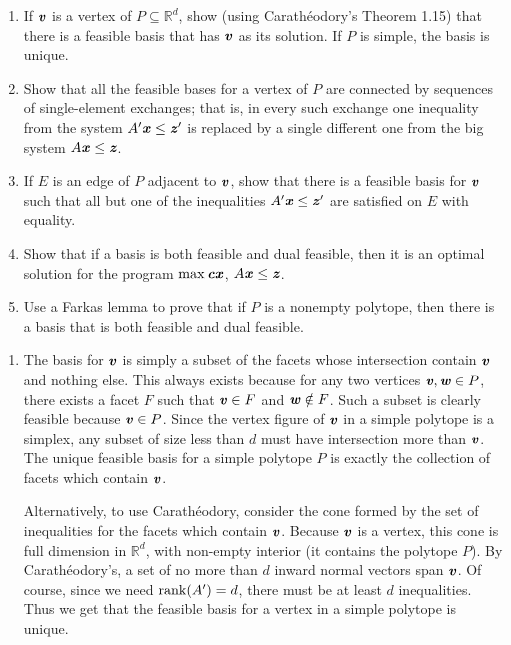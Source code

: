 \documentclass{article}
\begin{document}
\begin{enumerate}
\begin{enumerate}[label=(\roman*)]
\item If $\textbf{\textit{v}}$ is a vertex of $P \subseteq \mathbb{R}^d$, show (using Carath\'eodory's Theorem 1.15) that there is a feasible basis that has $\textbf{\textit{v}}$ as its solution. If $P$ is simple, the basis is unique.

\item Show that all the feasible bases for a vertex of $P$ are connected by sequences of single-element exchanges; that is, in every such exchange one inequality from the system $A'\textbf{\textit{x}} \le \textbf{\textit{z}}'$ is replaced by a single different one from the big system $A\textbf{\textit{x}} \le \textbf{\textit{z}}$.

\item If $E$ is an edge of $P$ adjacent to $\textbf{\textit{v}}$, show that there is a feasible basis for $\textbf{\textit{v}}$ such that all but one of the inequalities $A'\textbf{\textit{x}} \le \textbf{\textit{z}}'$ are satisfied on $E$ with equality.

\item Show that if a basis is both feasible and dual feasible, then it is an optimal solution for the program $\max \textbf{\textit{cx}}$, $A\textbf{\textit{x}} \le \textbf{\textit{z}}$.

\item Use a Farkas lemma to prove that if $P$ is a nonempty polytope, then there is a basis that is both feasible and dual feasible.
\end{enumerate}

\begin{solution}
\begin{enumerate}[label=(\roman*)]
    \item The basis for $\textbf{\textit{v}}$ is simply a subset of the facets whose intersection contain $\textbf{\textit{v}}$ and nothing else. This always exists because for any two vertices $\textbf{\textit{v}}, \textbf{\textit{w}} \in P$, there exists a facet $F$ such that $\textbf{\textit{v}} \in F$ and $\textbf{\textit{w}} \notin F$. Such a subset is clearly feasible because $\textbf{\textit{v}} \in P$. Since the vertex figure of $\textbf{\textit{v}}$ in a simple polytope is a simplex, any subset of size less than $d$ must have intersection more than $\textbf{\textit{v}}$. The unique feasible basis for a simple polytope $P$ is exactly the collection of facets which contain $\textbf{\textit{v}}$.

    Alternatively, to use Carath\'eodory, consider the cone formed by the set of inequalities for the facets which contain $\textbf{\textit{v}}$. Because $\textbf{\textit{v}}$ is a vertex, this cone is full dimension in $\mathbb{R}^d$, with non-empty interior (it contains the polytope $P$). By Carath\'eodory's, a set of no more than $d$ inward normal vectors span $\textbf{\textit{v}}$. Of course, since we need $\operatorname{rank}(A') = d$, there must be at least $d$ inequalities. Thus we get that the feasible basis for a vertex in a simple polytope is unique.


\end{enumerate}
\end{solution}
\end{enumerate}
\end{document}
